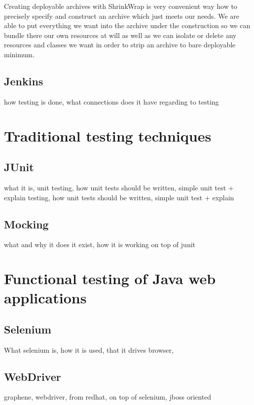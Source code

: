 \documentclass[12pt,final,oneside]{fithesis}
\begin{document}
Creating deployable archives with ShrinkWrap is very convenient way how to precisely specify and construct an archive which just meets our needs. We are able to put everything we want into the archive under the construction so we can bundle there our own resources at will as well as we can isolate or delete any resources and classes we want in order to strip an archive to bare deployable minimum.

		\subsection{Jenkins}

how testing is done, what connections does it have regarding to testing

	\section{Traditional testing techniques}
		\subsection{JUnit}
		
what it is, unit testing, how unit tests should be written, simple unit test + explain		testing, how unit tests should be written, simple unit test + explain
		
		\subsection{Mocking}

what and why it does it exist, how it is working on top of junit

	\section{Functional testing of Java web applications}
		\subsection{Selenium}

What selenium is, how it is used, that it drives browser, 		
		
		\subsection{WebDriver}

graphene, webdriver, from redhat, on top of selenium, jboss oriented
\end{document}
